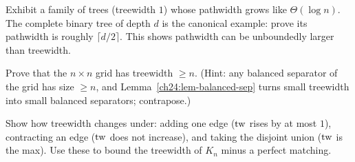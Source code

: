 \begin{exercise}
Exhibit a family of trees (treewidth $1$) whose pathwidth grows like
$\Theta(\log n)$. The complete binary tree of depth $d$ is the canonical example:
prove its pathwidth is roughly $\lceil d/2\rceil$. This shows pathwidth can be
unboundedly larger than treewidth.
\end{exercise}

\begin{exercise}
Prove that the $n\times n$ grid has treewidth $\ge n$. (Hint: any balanced
separator of the grid has size $\ge n$, and Lemma~\ref{ch24:lem-balanced-sep}
turns small treewidth into small balanced separators; contrapose.)
\end{exercise}

\begin{exercise}
Show how treewidth changes under: adding one edge ($\operatorname{tw}$ rises by at most $1$),
contracting an edge ($\operatorname{tw}$ does not increase), and taking the disjoint union ($\operatorname{tw}$
is the max). Use these to bound the treewidth of $K_n$ minus a perfect matching.
\end{exercise}
